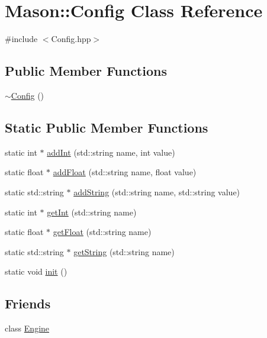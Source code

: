 \hypertarget{class_mason_1_1_config}{}\section{Mason\+:\+:Config Class Reference}
\label{class_mason_1_1_config}


{\ttfamily \#include $<$Config.\+hpp$>$}

\subsection*{Public Member Functions}
\begin{DoxyCompactItemize}
\item 
\hyperlink{class_mason_1_1_config_a543dce59b66475c5108088ee4ce1cdfc}{$\sim$\+Config} ()
\end{DoxyCompactItemize}
\subsection*{Static Public Member Functions}
\begin{DoxyCompactItemize}
\item 
static int $\ast$ \hyperlink{class_mason_1_1_config_af80adf2ed2290a3d714fb0407ee8fe55}{add\+Int} (std\+::string name, int value)
\item 
static float $\ast$ \hyperlink{class_mason_1_1_config_aa34f25a92ea33607425da418efabf47f}{add\+Float} (std\+::string name, float value)
\item 
static std\+::string $\ast$ \hyperlink{class_mason_1_1_config_a426f9e3f5de94a89dadfb7531d3b1d39}{add\+String} (std\+::string name, std\+::string value)
\item 
static int $\ast$ \hyperlink{class_mason_1_1_config_aafb3b1eb520c81f3002d4aa78e400ea0}{get\+Int} (std\+::string name)
\item 
static float $\ast$ \hyperlink{class_mason_1_1_config_a0e95110c092d4d3617a54a3ab3e4f70a}{get\+Float} (std\+::string name)
\item 
static std\+::string $\ast$ \hyperlink{class_mason_1_1_config_abc367cc6194d049807fab3ff684996e3}{get\+String} (std\+::string name)
\item 
static void \hyperlink{class_mason_1_1_config_a91bcb187ed95ec673137e413a4d77203}{init} ()
\end{DoxyCompactItemize}
\subsection*{Friends}
\begin{DoxyCompactItemize}
\item 
class \hyperlink{class_mason_1_1_config_a3e1914489e4bed4f9f23cdeab34a43dc}{Engine}
\end{DoxyCompactItemize}


